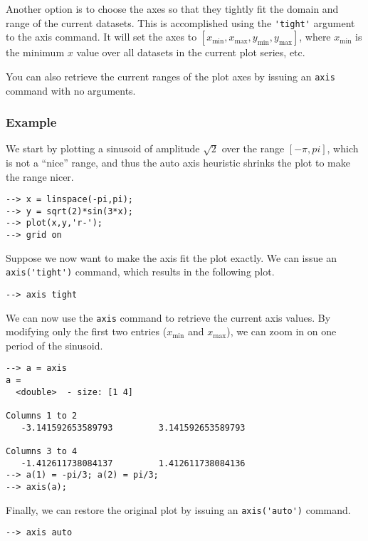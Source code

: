 Another option is to choose the axes so that they tightly fit the
domain and range of the current datasets.  This is accomplished
using the \verb|'tight'| argument to the axis command.  It will
set the axes to $[x_{\min},x_{\max},y_{\min},y_{\max}]$, where
$x_{\min}$ is the minimum $x$ value over all datasets in the current
plot series, etc.

You can also retrieve the current ranges of the plot axes by issuing
an \verb|axis| command with no arguments.
\subsubsection{Example}
We start by plotting a sinusoid of amplitude $\sqrt{2}$ over the 
range $[-\pi,pi]$, which is not a ``nice'' range, and thus the
auto axis heuristic shrinks the plot to make the range nicer.
\begin{verbatim}
--> x = linspace(-pi,pi);
--> y = sqrt(2)*sin(3*x);
--> plot(x,y,'r-');
--> grid on
\end{verbatim}


Suppose we now want to make the axis fit the plot exactly.  We can issue an
\verb|axis('tight')| command, which results in the following plot.
\begin{verbatim}
--> axis tight
\end{verbatim}


We can now use the \verb|axis| command to retrieve the current axis values.  By
modifying only the first two entries ($x_{\min}$ and $x_{\max}$), we can
zoom in on one period of the sinusoid.
\begin{verbatim}
--> a = axis
a = 
  <double>  - size: [1 4]
 
Columns 1 to 2
   -3.141592653589793         3.141592653589793      
 
Columns 3 to 4
   -1.412611738084137         1.412611738084136      
--> a(1) = -pi/3; a(2) = pi/3;
--> axis(a);
\end{verbatim}


Finally, we can restore the original plot by issuing an \verb|axis('auto')|
command.
\begin{verbatim}
--> axis auto
\end{verbatim}

